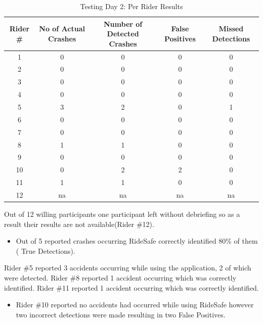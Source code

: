 \begin{table}
\caption{Testing Day 2: Per Rider Results}
\label{day2}
\begin{center}

 \begin{tabular}{||c| c| c| c| c||} 

 \hline
 Rider \# & No of Actual Crashes & Number of Detected Crashes & False Positives  & Missed Detections\\ [0.5ex] 
 \hline\hline
 1 & 0 & 0 & 0 & 0 \\ 
 \hline
2 & 0 & 0 & 0 & 0\\ 
 \hline
3 & 0 & 0 & 0 & 0\\ 
 \hline
4 & 0 & 0 & 0 & 0\\ 
 \hline
5 & 3 & 2 & 0 & 1\\ 
 \hline
6 & 0 & 0 & 0 & 0\\ 
 \hline
7 & 0 & 0 & 0 & 0\\ 
 \hline
8 & 1 & 1 & 0 & 0\\ 
 \hline
9 & 0 & 0 & 0 & 0\\ 
 \hline
10 & 0 & 2 & 2 & 0\\ 
 \hline
11 & 1 & 1 & 0 & 0\\ 
 \hline
12 & na & na & na & na\\ [1ex] 
 \hline
\end{tabular}
\end{center}
\end{table}
\vspace{1cm}


Out of 12 willing participants one participant left without debriefing so as a result their results are not available(Rider \#12). 

\begin{itemize}
\item Out of 5 reported crashes occurring RideSafe correctly identified 80\% of them ( True Detections).
\end {itemize}

Rider \#5 reported 3 accidents occurring while using the application, 2 of which were detected.
Rider \#8 reported 1 accident occurring which was correctly identified.
Rider \#11 reported 1 accident occurring which was correctly identified.

\begin{itemize}
\item Rider \#10 reported no accidents had occurred while using RideSafe however two incorrect  
detections were made resulting in two False Positives.
\end{itemize}

